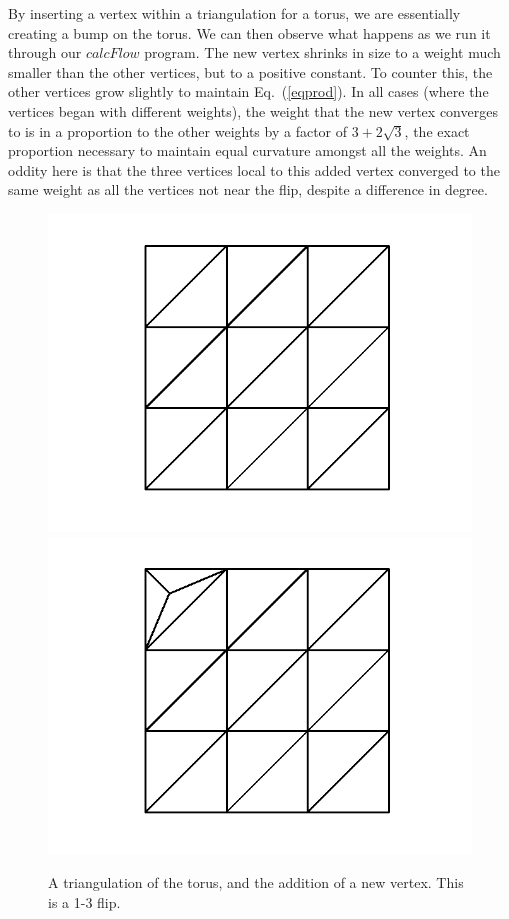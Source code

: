 \documentclass[12pt]{article}
\begin{document}
\noindent By inserting a vertex within a triangulation for a torus, we are essentially creating a bump on the torus. We can then observe what happens as we run it through our $calcFlow$ program. The new vertex shrinks in size to a weight much smaller than the other vertices, but to a positive constant. To counter this, the other vertices grow slightly to maintain Eq.~(\ref{eqprod}). In all cases (where the vertices began with different weights), the weight that the new vertex converges to is in a proportion to the other weights by a factor of $3+2\sqrt{3}$, the exact proportion necessary to maintain equal curvature amongst all the weights. An oddity here is that the three vertices local to this added vertex converged to the same weight as all the vertices not near the flip, despite a difference in degree.\newline

\begin{figure}[ht]
\includegraphics[scale = 0.5]{Pictures/torus22.png}
\includegraphics[scale = 0.5]{Pictures/torus2addvertex2.png}
\caption{A triangulation of the torus, and the addition of a new vertex. This is a 1-3 flip.}
\label{torusaddv}
\end{figure}
\end{document}
